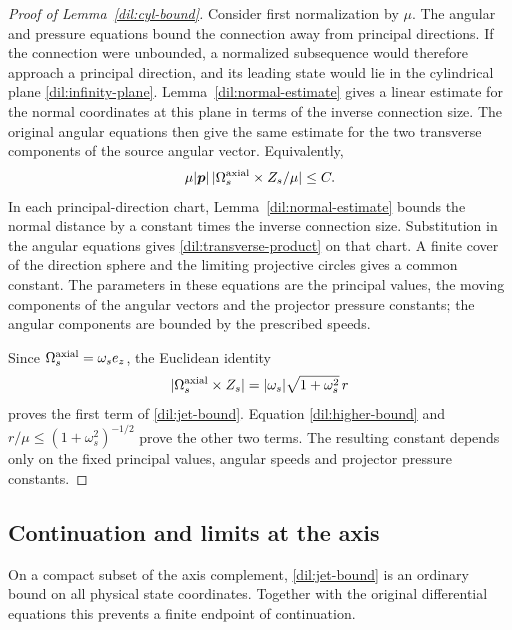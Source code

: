 \documentclass[11pt,a4paper]{article}
\numberwithin{equation}{section}
\theoremstyle{plain}
\theoremstyle{definition}
\theoremstyle{remark}
\begin{document}
\begin{proof}[Proof of Lemma~\ref{dil:cyl-bound}]
Consider first normalization by $\mu$. The angular and pressure
equations bound the connection away from principal directions. If
the connection were unbounded, a normalized subsequence would
therefore approach a principal direction, and its leading state
would lie in the cylindrical plane \eqref{dil:infinity-plane}.
Lemma~\ref{dil:normal-estimate} gives a linear estimate for the normal
coordinates at this plane in terms of the inverse connection size.
The original angular equations then give the same estimate for the
two transverse components of the source angular vector. Equivalently,
\begin{equation}\label{dil:transverse-product}
       \mu|\boldsymbol p|\,|\Omega_s^{\rm axial}\times Z_s/\mu|\le C.
\end{equation}
In each principal-direction chart,
Lemma~\ref{dil:normal-estimate} bounds the normal distance by a
constant times the inverse connection size. Substitution in the
angular equations gives \eqref{dil:transverse-product} on that chart.
A finite cover of the direction sphere and the limiting projective
circles gives a common constant. The parameters in these equations
are the principal values, the moving components of the angular
vectors and the projector pressure constants; the angular components
are bounded by the prescribed speeds.

Since $\Omega_s^{\rm axial}=\omega_se_z$, the Euclidean identity
\[
 |\Omega_s^{\rm axial}\times Z_s|
                 =|\omega_s|\sqrt{1+\omega_s^2}\,r
\]
proves the first term of \eqref{dil:jet-bound}.  Equation
\eqref{dil:higher-bound} and
$r/\mu\le(1+\omega_s^2)^{-1/2}$ prove the other two terms.
The resulting constant depends only on the fixed principal values,
angular speeds and projector pressure constants.
\end{proof}

\subsection{Continuation and limits at the axis}

On a compact subset of the axis complement,
\eqref{dil:jet-bound} is an ordinary bound on all physical state
coordinates.  Together with the original differential equations this
prevents a finite endpoint of continuation.  
\end{document}
